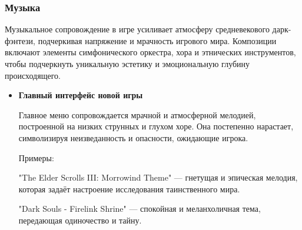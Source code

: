 \documentclass{article}
\begin{document}
\subsubsection{Музыка}
Музыкальное сопровождение в игре усиливает атмосферу средневекового дарк-фэнтези, подчеркивая напряжение и мрачность игрового мира. Композиции включают элементы симфонического оркестра, хора и этнических инструментов, чтобы подчеркнуть уникальную эстетику и эмоциональную глубину происходящего.
\begin{itemize}
\item \textbf{Главный интерфейс новой игры}\par
Главное меню сопровождается мрачной и атмосферной мелодией, построенной на низких струнных и глухом хоре. Она постепенно нарастает, символизируя неизведанность и опасности, ожидающие игрока.\par
Примеры:\par
"The Elder Scrolls III: Morrowind Theme" — гнетущая и эпическая мелодия, которая задаёт настроение исследования таинственного мира.\par
"Dark Souls - Firelink Shrine" — спокойная и меланхоличная тема, передающая одиночество и тайну.


\end{itemize}
\end{document}
